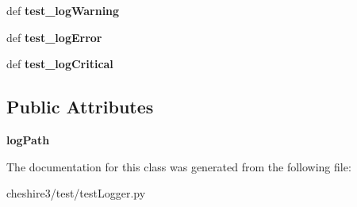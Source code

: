 \begin{DoxyCompactItemize}
\item 
\hypertarget{classcheshire3_1_1test_1_1test_logger_1_1_simple_logger_min_level_test_case_acaa9ebe92a9e494241bd54301127a3d2}{def {\bfseries test\-\_\-log\-Warning}}\label{classcheshire3_1_1test_1_1test_logger_1_1_simple_logger_min_level_test_case_acaa9ebe92a9e494241bd54301127a3d2}

\item 
\hypertarget{classcheshire3_1_1test_1_1test_logger_1_1_simple_logger_min_level_test_case_ab8def9b222b79ad07dee8307a332c155}{def {\bfseries test\-\_\-log\-Error}}\label{classcheshire3_1_1test_1_1test_logger_1_1_simple_logger_min_level_test_case_ab8def9b222b79ad07dee8307a332c155}

\item 
\hypertarget{classcheshire3_1_1test_1_1test_logger_1_1_simple_logger_min_level_test_case_a256a6bd13e000d8f66da3aa277bd62e6}{def {\bfseries test\-\_\-log\-Critical}}\label{classcheshire3_1_1test_1_1test_logger_1_1_simple_logger_min_level_test_case_a256a6bd13e000d8f66da3aa277bd62e6}

\end{DoxyCompactItemize}
\subsection*{Public Attributes}
\begin{DoxyCompactItemize}
\item 
\hypertarget{classcheshire3_1_1test_1_1test_logger_1_1_simple_logger_min_level_test_case_a9a50ff3bbd4a9858cd58f6b17f12e22d}{{\bfseries log\-Path}}\label{classcheshire3_1_1test_1_1test_logger_1_1_simple_logger_min_level_test_case_a9a50ff3bbd4a9858cd58f6b17f12e22d}

\end{DoxyCompactItemize}


The documentation for this class was generated from the following file\-:\begin{DoxyCompactItemize}
\item 
cheshire3/test/test\-Logger.\-py\end{DoxyCompactItemize}
